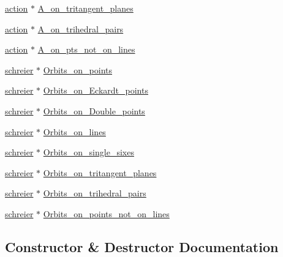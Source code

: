 \begin{DoxyCompactItemize}
\mbox{\hyperlink{classaction}{action}} $\ast$ \mbox{\hyperlink{classsurface__object__with__action_a93093bb53fdcf5cc2639be1a0d287cf2}{A\+\_\+on\+\_\+tritangent\+\_\+planes}}
\item 
\mbox{\hyperlink{classaction}{action}} $\ast$ \mbox{\hyperlink{classsurface__object__with__action_a80dc0a837c67fcb1d43902dc2a02bb3a}{A\+\_\+on\+\_\+trihedral\+\_\+pairs}}
\item 
\mbox{\hyperlink{classaction}{action}} $\ast$ \mbox{\hyperlink{classsurface__object__with__action_a39f3bd9acf8421bd4209202e0162de1a}{A\+\_\+on\+\_\+pts\+\_\+not\+\_\+on\+\_\+lines}}
\item 
\mbox{\hyperlink{classschreier}{schreier}} $\ast$ \mbox{\hyperlink{classsurface__object__with__action_a3e30507c74d7c9245507c02445d94e17}{Orbits\+\_\+on\+\_\+points}}
\item 
\mbox{\hyperlink{classschreier}{schreier}} $\ast$ \mbox{\hyperlink{classsurface__object__with__action_a017c035a7908b80fadb9e9cfe198e23d}{Orbits\+\_\+on\+\_\+\+Eckardt\+\_\+points}}
\item 
\mbox{\hyperlink{classschreier}{schreier}} $\ast$ \mbox{\hyperlink{classsurface__object__with__action_a9b78d08dfd6ca1ddb63c8715d45fe8a7}{Orbits\+\_\+on\+\_\+\+Double\+\_\+points}}
\item 
\mbox{\hyperlink{classschreier}{schreier}} $\ast$ \mbox{\hyperlink{classsurface__object__with__action_aca122f3960d34227552fec1ca21de1ae}{Orbits\+\_\+on\+\_\+lines}}
\item 
\mbox{\hyperlink{classschreier}{schreier}} $\ast$ \mbox{\hyperlink{classsurface__object__with__action_a21c64a241b7658860453d1de11420ee7}{Orbits\+\_\+on\+\_\+single\+\_\+sixes}}
\item 
\mbox{\hyperlink{classschreier}{schreier}} $\ast$ \mbox{\hyperlink{classsurface__object__with__action_aa98a66b9ce4b64b7afa7bf35fb5b7b30}{Orbits\+\_\+on\+\_\+tritangent\+\_\+planes}}
\item 
\mbox{\hyperlink{classschreier}{schreier}} $\ast$ \mbox{\hyperlink{classsurface__object__with__action_acad61b6404b3e447e9d512dbce05bb84}{Orbits\+\_\+on\+\_\+trihedral\+\_\+pairs}}
\item 
\mbox{\hyperlink{classschreier}{schreier}} $\ast$ \mbox{\hyperlink{classsurface__object__with__action_aba9e76e8666032bb19b7a3f15c6847b6}{Orbits\+\_\+on\+\_\+points\+\_\+not\+\_\+on\+\_\+lines}}
\end{DoxyCompactItemize}


\subsection{Constructor \& Destructor Documentation}
\mbox{\label{classsurface__object__with__action_a0bbd7fbace8f0057225b08c708c53d8d}} 
